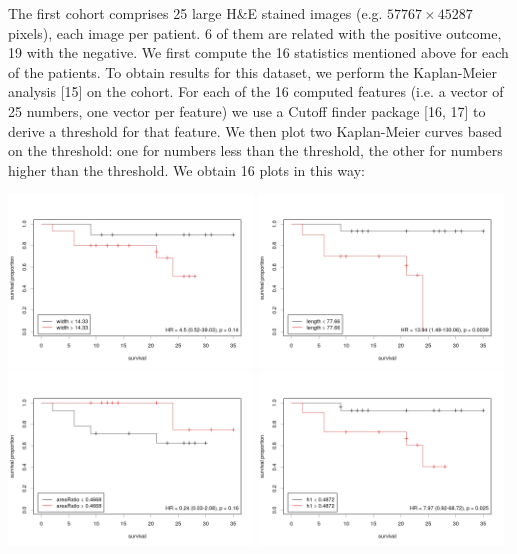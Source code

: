 \documentclass{article}
\begin{document}
The first cohort comprises 25 large H\&E stained images (e.g. $57767 \times 45287$ pixels),
each image per patient. 6 of them are related with the positive outcome, 19 with the negative.
We first compute the 16 statistics mentioned above for each of the patients. To obtain results
for this dataset, we perform the Kaplan-Meier analysis [15] on the cohort. For each of the 16
computed features (i.e. a vector of 25 numbers, one vector per feature) we use a Cutoff finder
package [16, 17] to derive a threshold for that feature. We then plot two Kaplan-Meier curves
based on the threshold: one for numbers less than the threshold, the other for numbers higher
than the threshold. We obtain 16 plots in this way:

  \includegraphics[width=65mm]{plots/width.jpg} \includegraphics[width=65mm]{plots/length.jpg} \\
  \includegraphics[width=65mm]{plots/ratio.jpg} \includegraphics[width=65mm]{plots/h1.jpg} \\
\end{document}
